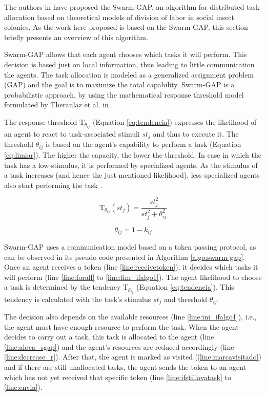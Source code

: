The authors in \cite{ferreira2007swarm} have proposed the Swarm-GAP, an algorithm for distributed task allocation based on theoretical models of division of labor in social insect colonies. As the work here proposed is based on the Swarm-GAP, this section briefly presents an overview of this algorithm.

Swarm-GAP allows that each agent chooses which tasks it will perform. This decision is based just on local information, thus leading to little communication the agents. The task allocation is modeled as a generalized assignment problem (GAP) and the goal is to maximize the total capability.
Swarm-GAP is a probabilistic approach, by using the mathematical response threshold model formulated by Theraulaz et al. in \cite{theraulaz1998response}.

The response threshold $\textrm{T}_{\theta_{ij}}$ (Equation \ref{eq:tendencia}) expresses the likelihood of an agent to react to task-associated stimuli $st_{j}$ and thus to execute it. The threshold $\theta_{ij}$ is based on the agent's capability to perform a task (Equation \ref{eq:limiar}). The higher the capacity, the lower the threshold. 
In case in which the task has a low-stimulus, it is performed by specialized agents. As the stimulus of a task increases (and hence the just mentioned likelihood), less specialized agents also start performing the task \cite{bonabeau1999swarm}.

\begin{equation} \label{eq:tendencia}
	\textrm{T}_{\theta_{ij}}(st_j) = \frac{st_{j}^2}{st_{j}^2 + \theta_{ij}^2}
\end{equation}

\begin{equation} \label{eq:limiar}
	\theta_{ij} = 1 - k_{ij}
\end{equation}

Swarm-GAP uses a communication model based on a token passing protocol, as can be observed in its pseudo code presented in Algorithm \ref{algo:swarm-gap}. Once an agent receives a token (line \ref{line:receivetoken}), it decides which tasks it will perform (line \ref{line:forall} to \ref{line:fim_ifalgo1}). The agent likelihood to choose a task is determined by the tendency $\textrm{T}_{\theta_{ij}}$ (Equation \ref{eq:tendencia}). 
This tendency is calculated with the task's stimulus $st_{j}$ and threshold $\theta_{ij}$.

The decision also depends on the available resources (line \ref{line:ini_ifalgo1}), i.e., the agent must have enough resource to perform the task. 
When the agent decides to carry out a task, this task is allocated to the agent (line \ref{line:aloca_sgap}) and the agent's resources are reduced accordingly (line \ref{line:decrease_r}). After that, the agent is marked as visited (\ref{line:marcavisitado}) and if there are still unallocated tasks, the agent sends the token to an agent which has not yet received that specific token (line \ref{line:ifstillavatask} to \ref{line:envia}).

